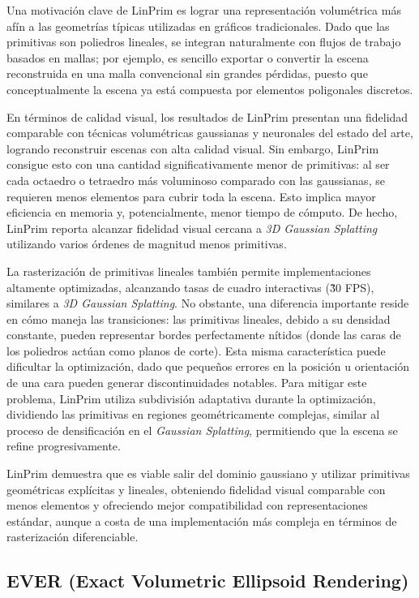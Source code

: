 Una motivación clave de LinPrim es lograr una representación volumétrica más afín a las geometrías típicas utilizadas en gráficos tradicionales. Dado que las primitivas son poliedros lineales, se integran naturalmente con flujos de trabajo basados en mallas; por ejemplo, es sencillo exportar o convertir la escena reconstruida en una malla convencional sin grandes pérdidas, puesto que conceptualmente la escena ya está compuesta por elementos poligonales discretos.

En términos de calidad visual, los resultados de LinPrim presentan una fidelidad comparable con técnicas volumétricas gaussianas y neuronales del estado del arte, logrando reconstruir escenas con alta calidad visual. Sin embargo, LinPrim consigue esto con una cantidad significativamente menor de primitivas: al ser cada octaedro o tetraedro más voluminoso comparado con las gaussianas, se requieren menos elementos para cubrir toda la escena. Esto implica mayor eficiencia en memoria y, potencialmente, menor tiempo de cómputo. De hecho, LinPrim reporta alcanzar fidelidad visual cercana a \textit{3D Gaussian Splatting} utilizando varios órdenes de magnitud menos primitivas.

La rasterización de primitivas lineales también permite implementaciones altamente optimizadas, alcanzando tasas de cuadro interactivas (\~ 30 FPS), similares a \textit{3D Gaussian Splatting}. No obstante, una diferencia importante reside en cómo maneja las transiciones: las primitivas lineales, debido a su densidad constante, pueden representar bordes perfectamente nítidos (donde las caras de los poliedros actúan como planos de corte). Esta misma característica puede dificultar la optimización, dado que pequeños errores en la posición u orientación de una cara pueden generar discontinuidades notables. Para mitigar este problema, LinPrim utiliza subdivisión adaptativa durante la optimización, dividiendo las primitivas en regiones geométricamente complejas, similar al proceso de densificación en el \textit{Gaussian Splatting}, permitiendo que la escena se refine progresivamente.

LinPrim demuestra que es viable salir del dominio gaussiano y utilizar primitivas geométricas explícitas y lineales, obteniendo fidelidad visual comparable con menos elementos y ofreciendo mejor compatibilidad con representaciones estándar, aunque a costa de una implementación más compleja en términos de rasterización diferenciable.


\subsection{EVER (Exact Volumetric Ellipsoid Rendering)}

